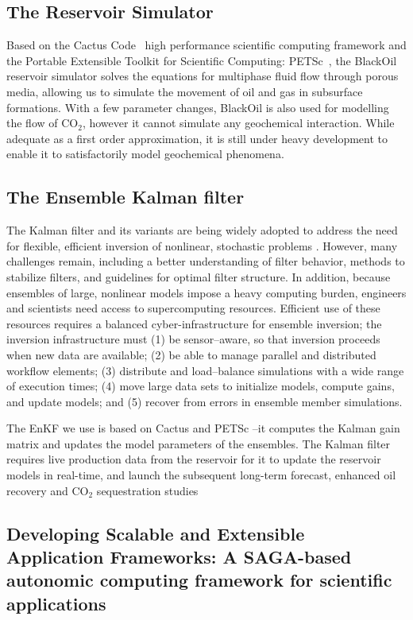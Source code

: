 \documentclass{rspublic}
\begin{document}
\subsection{The Reservoir Simulator} 

Based on the Cactus Code~\citep{cactus_web} high performance
scientific computing framework and the Portable Extensible Toolkit for
Scientific Computing: PETSc~\citep{PETSc}, the BlackOil reservoir
simulator solves the equations for multiphase fluid flow through
porous media, allowing us to simulate the movement of oil and gas in
subsurface formations. With a few parameter changes, BlackOil is also
used for modelling the flow of CO$_2$, however it cannot simulate any
geochemical interaction. While adequate as a first order
approximation, it is still under heavy development to enable it to
satisfactorily model geochemical phenomena.

\subsection{The Ensemble Kalman filter} 

The Kalman filter and its variants are being widely adopted to address
the need for flexible, efficient inversion of nonlinear, stochastic
problems \cite{DataAssim}. However, many challenges remain,
including a better understanding of filter behavior, methods to
stabilize filters, and guidelines for optimal filter structure. In
addition, because ensembles of large, nonlinear models impose a heavy
computing burden, engineers and scientists need access to
supercomputing resources. Efficient use of these resources requires a
balanced cyber-infrastructure for ensemble inversion; the inversion
infrastructure must (1) be sensor--aware, so that inversion proceeds
when new data are available; (2) be able to manage parallel and
distributed workflow elements; (3) distribute and load--balance
simulations with a wide range of execution times; (4) move large data
sets to initialize models, compute gains, and update models; and (5)
recover from errors in ensemble member simulations.

The EnKF we use is based on Cactus and PETSc --it computes the Kalman
gain matrix and updates the model parameters of the ensembles. The
Kalman filter requires live production data from the reservoir for it
to update the reservoir models in real-time, and launch the subsequent
long-term forecast, enhanced oil recovery and CO$_2$ sequestration
studies

\subsection{Developing Scalable and Extensible Application
  Frameworks: A SAGA-based autonomic computing framework for
  scientific applications}
\end{document}
